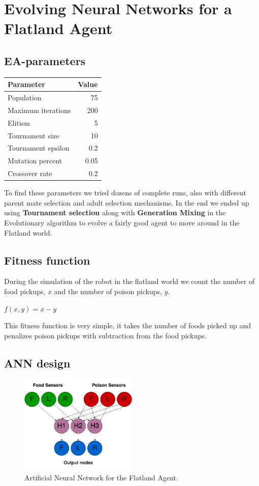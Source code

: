 \section{Evolving Neural Networks for a Flatland Agent}
\subsection{EA-parameters}
\begin{center}

\begin{tabular}{p{5cm} | r}
\textbf{Parameter} & \textbf{Value} \\
\hline
Population & 75 \\
Maximum iterations & 200 \\
Elitism & 5 \\
Tournament size & 10 \\
Tournament epsilon & 0.2 \\
Mutation percent & 0.05 \\
Crossover rate & 0.2 \\
\hline
\end{tabular}
\end{center}

To find these parameters we tried dozens of complete runs, also with different parent mate selection and adult selection mechanisms. In the end we ended up using \textbf{Tournament selection} along with \textbf{Generation Mixing} in the Evolutionary algorithm to evolve a fairly good agent to move around in the Flatland world.

\subsection{Fitness function}
During the simulation of the robot in the flatland world we count the number of food pickups, $x$ and the number of poison pickups, $y$. 
\begin{center}
	$f(x, y) = x - y$
\end{center}

This fitness function is very simple, it takes the number of foods picked up and penalizes poison pickups with subtraction from the food pickups.

\subsection{ANN design}

\begin{figure}[H]
  \centering
    \includegraphics[width=0.5\textwidth]{img/Flatland_network}
    \caption{Artificial Neural Network for the Flatland Agent.}
\end{figure}


